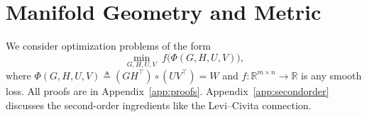 \documentclass[letterpaper, 10 pt, conference]{ieeeconf}
\newcommand{\R}{\mathbb{R}}
\newcommand{\cM}{\mathcal{M}}
\newcommand{\Had}{\circ}
\theoremstyle{plain}
\theoremstyle{definition}
\theoremstyle{remark}
\begin{document}

\section{Manifold Geometry and Metric}
\label{sec:geometry}

We consider optimization problems of the form
\begin{equation*}
  \min_{G,H,U,V} \; f\!\big(\Phi(G,H,U,V)\big),
\end{equation*}
where $\Phi(G,H,U,V) \triangleq (GH^\top)\Had(UV^\top) = W$ and $f\colon\R^{m\times n}\to\R$ is any smooth loss.
All proofs are in Appendix~\ref{app:proofs}. Appendix~\ref{app:secondorder} discusses the second-order ingredients like the Levi--Civita connection.
\end{document}
